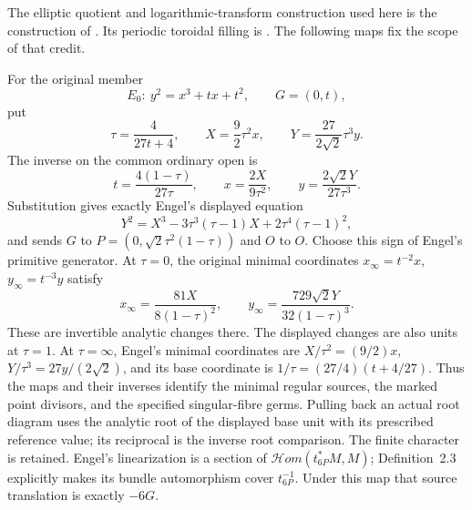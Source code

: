 \begin{remark}
\label{iv:source_transports}
The elliptic quotient and logarithmic-transform construction used here is
the construction of \cite[Section~2 and Remark~8.5]{Engel2026}.
Its periodic toroidal filling is \cite[Proposition~2.8]{Engel2026}.
The following maps fix the scope of that credit.

For the original member
\[
 E_0:\ y^2=x^3+tx+t^2,\qquad G=(0,t),
\]
put
\[
 \tau=\frac4{27t+4},\qquad
 X=\frac92\tau^2x,\qquad
 Y=\frac{27}{2\sqrt2}\tau^3y.
\]
The inverse on the common ordinary open is
\[
 t=\frac{4(1-\tau)}{27\tau},\qquad
 x=\frac{2X}{9\tau^2},\qquad
 y=\frac{2\sqrt2Y}{27\tau^3}.
\]
Substitution gives exactly Engel's displayed equation
\[
 Y^2=X^3-3\tau^3(\tau-1)X+2\tau^4(\tau-1)^2,
\]
and sends $G$ to
$P=(0,\sqrt2\tau^2(1-\tau))$ and $O$ to $O$.
Choose this sign of Engel's primitive generator.
At $\tau=0$, the original minimal coordinates
$x_\infty=t^{-2}x$, $y_\infty=t^{-3}y$ satisfy
\[
 x_\infty=\frac{81X}{8(1-\tau)^2},\qquad
 y_\infty=\frac{729\sqrt2Y}{32(1-\tau)^3}.
\]
These are invertible analytic changes there. The displayed changes are
also units at $\tau=1$. At $\tau=\infty$, Engel's minimal coordinates
are $X/\tau^2=(9/2)x$, $Y/\tau^3=27y/(2\sqrt2)$, and its base
coordinate is $1/\tau=(27/4)(t+4/27)$.
Thus the maps and their inverses identify the minimal regular sources,
the marked point divisors, and the specified singular-fibre germs.
Pulling back an actual root diagram uses the analytic root of the
displayed base unit with its prescribed reference value; its reciprocal
is the inverse root comparison. The finite character is retained.
Engel's linearization is a section of
$\mathcal Hom(t_{6P}^*M,M)$; Definition~2.3 explicitly makes its
bundle automorphism cover $t_{6P}^{-1}$. Under this map that source
translation is exactly $-6G$.


\end{remark}
